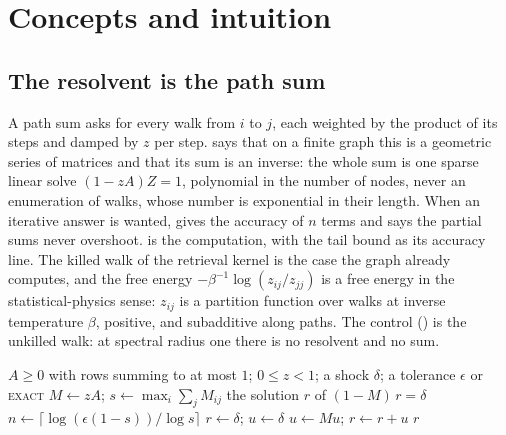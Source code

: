 \documentclass[11pt,a4paper]{article}
\theoremstyle{plain}
\theoremstyle{definition}
\theoremstyle{remark}
\newcommand{\norm}[1]{\left\lVert #1 \right\rVert}
\begin{document}
\section{Concepts and intuition}

\subsection{The resolvent is the path sum}

A path sum asks for every walk from $i$ to $j$, each weighted by the product of its steps and
damped by $z$ per step.  says that on a finite graph this is a geometric
series of matrices and that its sum is an inverse: the whole sum is one sparse linear solve
$(1-zA)Z = 1$, polynomial in the number of nodes, never an enumeration of walks, whose number is
exponential in their length. When an iterative answer is wanted,  gives the
accuracy of $n$ terms and says the partial sums never overshoot.  is the
computation, with the tail bound as its accuracy line. The killed walk of the retrieval kernel
is the case the graph already computes, and the free energy $-\beta^{-1}\log(z_{ij}/z_{jj})$ is a
free energy in the statistical-physics sense: $z_{ij}$ is a partition function over walks at
inverse temperature $\beta$, positive, and subadditive along paths. The control
() is the unkilled walk: at spectral radius one there is no resolvent and no sum.

\begin{algorithm}[t]
\caption{Ripple of a shock $\delta$ along a relation $A$ with damping $z$.}
\label{alg:ripple}
\begin{algorithmic}[1]
\Require $A \ge 0$ with rows summing to at most $1$; $0 \le z < 1$; a shock $\delta$; a tolerance
  $\epsilon$ or \textsc{exact}
\State $M \gets zA$; \quad $s \gets \max_i \sum_j M_{ij}$ 
  \State \Return the solution $r$ of $(1 - M)\,r = \delta$ 
\Else
  \State $n \gets \lceil \log(\epsilon(1-s)) / \log s \rceil$ 
  \State $r \gets \delta$; \quad $u \gets \delta$
    \State $u \gets M u$; \quad $r \gets r + u$ 
  \EndFor
  \State \Return $r$ \Comment{entrywise within $\epsilon\norm{\delta}_\infty$ of the sum}
\EndIf
\end{algorithmic}
\end{algorithm}
\end{document}
